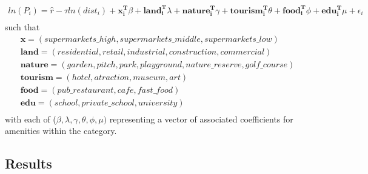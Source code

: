 \documentclass{article}
\begin{document}
\begin{gather*}
ln(P_i) = \hat{r} - \tau ln(dist_i) + \boldsymbol{x_i^{T}} \beta + \boldsymbol{land_i^{T}}\lambda + \boldsymbol{nature_i^{T}} \gamma + \boldsymbol{tourism_i^{T}} \theta + \boldsymbol{food_i^{T}} \phi + \boldsymbol{edu_i^{T}} \mu + \epsilon_i \\
\end{gather*}
such that
\begin{gather*}
\boldsymbol{x} = (supermarkets\_high, supermarkets\_middle, supermarkets\_low) \\
\boldsymbol{land} = (residential, retail, industrial, construction, commercial) \\
\boldsymbol{nature} = (garden, pitch, park, playground, nature\_reserve, golf\_course) \\
\boldsymbol{tourism} = (hotel, atraction, museum, art) \\
\boldsymbol{food} = (pub\_restaurant, cafe, fast\_food) \\ 
\boldsymbol{edu} = (school, private\_school, university) \\ 
\end{gather*}
with each of ($\beta, \lambda, \gamma, \theta, \phi, \mu)$ representing a vector of associated coefficients for amenities within the category.  


\subsection{Results}
\end{document}
